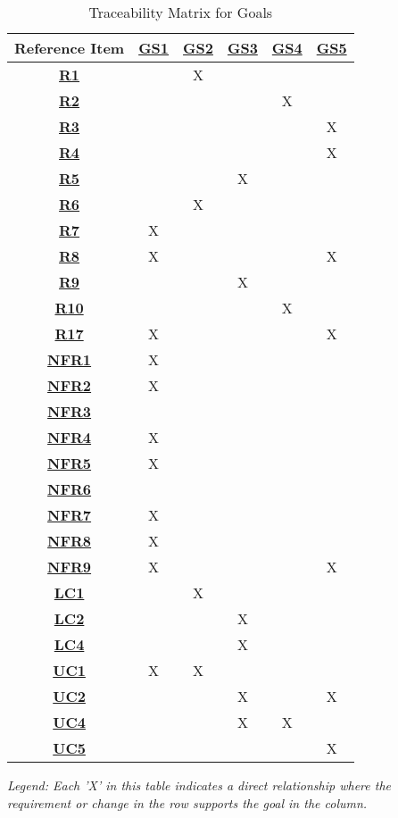 \begin{table}[ht]
\centering
\begin{tabular}{|c|c|c|c|c|c|}
\hline
\textbf{Reference Item} &
\hyperref[G_enjoyable]{\textbf{GS1}} &
\hyperref[G_multiplayer]{\textbf{GS2}} &
\hyperref[G_customization]{\textbf{GS3}} &
\hyperref[G_presets]{\textbf{GS4}} &
\hyperref[G_3D]{\textbf{GS5}} \\ \hline
\hyperref[R1]{\textbf{R1}} & &X & & & \\ \hline
\hyperref[R2]{\textbf{R2}} & & & &X & \\ \hline
\hyperref[R3]{\textbf{R3}} & & & & &X \\ \hline
\hyperref[R4]{\textbf{R4}} & & & & &X \\ \hline
\hyperref[R5]{\textbf{R5}} & & &X & & \\ \hline
\hyperref[R6]{\textbf{R6}} & &X & & & \\ \hline
\hyperref[R7]{\textbf{R7}} &X & & & & \\ \hline
\hyperref[R8]{\textbf{R8}} &X & & & &X \\ \hline
\hyperref[R9]{\textbf{R9}} & & &X & & \\ \hline
\hyperref[R10]{\textbf{R10}} & & & &X & \\ \hline
\hyperref[R17]{\textbf{R17}} &X & & & &X \\ \hline
\hyperref[NFR1]{\textbf{NFR1}} &X & & & & \\ \hline
\hyperref[NFR2]{\textbf{NFR2}} &X & & & & \\ \hline
\hyperref[NFR3]{\textbf{NFR3}} & & & & & \\ \hline
\hyperref[NFR4]{\textbf{NFR4}} &X & & & & \\ \hline
\hyperref[NFR5]{\textbf{NFR5}} &X & & & & \\ \hline
\hyperref[NFR6]{\textbf{NFR6}} & & & & & \\ \hline
\hyperref[NFR7]{\textbf{NFR7}} &X & & & & \\ \hline
\hyperref[NFR8]{\textbf{NFR8}} &X & & & & \\ \hline
\hyperref[NFR9]{\textbf{NFR9}} &X & & & &X \\ \hline
\hyperref[LC_find_opp]{\textbf{LC1}} & &X & & & \\ \hline
\hyperref[LC_dice]{\textbf{LC2}} & & &X & & \\ \hline
\hyperref[LC_score_calc]{\textbf{LC4}} & & &X & & \\ \hline
\hyperref[ULC_multiplayer]{\textbf{UC1}} &X &X & & & \\ \hline
\hyperref[ULC_dice]{\textbf{UC2}} & & &X & &X \\ \hline
\hyperref[ULC_customization]{\textbf{UC4}} & & &X &X & \\ \hline
\hyperref[ULC_3D]{\textbf{UC5}} & & & & &X \\ \hline
\end{tabular}
\caption{Traceability Matrix for Goals}
\textit{Legend: Each 'X' in this table indicates a direct relationship where the requirement or change in the row supports the goal in the column.}
\label{table:goals_traceability}
\end{table}


